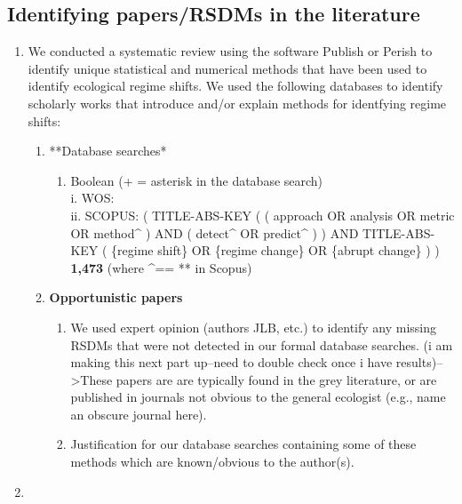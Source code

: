 \documentclass[12pt,twoside]{reedthesis}
\providecommand{\tightlist}{%
  \setlength{\itemsep}{0pt}\setlength{\parskip}{0pt}}
\def\labelenumi{\arabic{enumi}.}
\def\labelenumi{\arabic{enumi}.}
\begin{document}
\subsection{Identifying papers/RSDMs in the
literature}\label{identifying-papersrsdms-in-the-literature}
\begin{enumerate}
\def\labelenumi{\arabic{enumi}.}
\tightlist
\item
  We conducted a systematic review using the software Publish or Perish
  to identify unique statistical and numerical methods that have been
  used to identify ecological regime shifts. We used the following
  databases to identify scholarly works that introduce and/or explain
  methods for identfying regime shifts:
  \begin{enumerate}
  \def\labelenumii{\roman{enumii}.}
  \tightlist
  \item
    **Database searches*
    \begin{enumerate}
    \def\labelenumiii{\alph{enumiii}.}
    \tightlist
    \item
      Boolean (+ = asterisk in the database search)\\
      i. WOS:\\
      ii. SCOPUS: ( TITLE-ABS-KEY ( ( approach OR analysis OR metric OR
      method\^{} ) AND ( detect\^{} OR predict\^{} ) ) AND TITLE-ABS-KEY
      ( \{regime shift\} OR \{regime change\} OR \{abrupt change\} ) )
      \textbf{1,473} (where \^{}== ** in Scopus)
    \end{enumerate}
  \item
    \textbf{Opportunistic papers}
    \begin{enumerate}
    \def\labelenumiii{\alph{enumiii}.}
    \tightlist
    \item
      We used expert opinion (authors JLB, etc.) to identify any missing
      RSDMs that were not detected in our formal database searches. (i
      am making this next part up--need to double check once i have
      results)--\textgreater{}These papers are are typically found in
      the grey literature, or are published in journals not obvious to
      the general ecologist (e.g., name an obscure journal here).\\
    \item
      Justification for our database searches containing some of these
      methods which are known/obvious to the author(s).
    \end{enumerate}
  \end{enumerate}
\item

\end{enumerate}
\end{document}
